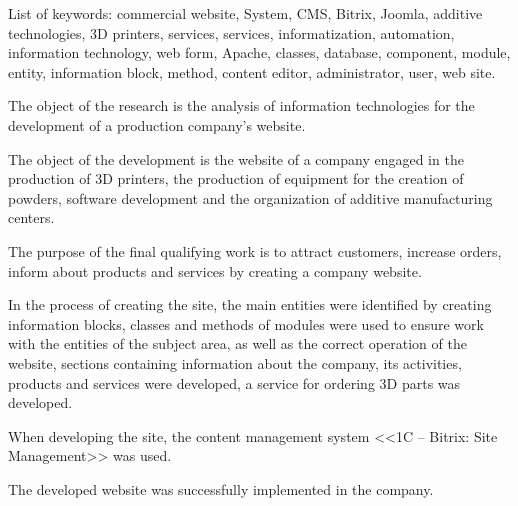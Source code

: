 List of keywords: commercial website, System, CMS, Bitrix, Joomla, additive technologies, 3D printers, services, services, informatization, automation, information technology, web form, Apache, classes, database, component, module, entity, information block, method, content editor, administrator, user, web site.

The object of the research is the analysis of information technologies for the development of a production company's website.

The object of the development is the website of a company engaged in the production of 3D printers, the production of equipment for the creation of powders, software development and the organization of additive manufacturing centers.

The purpose of the final qualifying work is to attract customers, increase orders, inform about products and services by creating a company website.

In the process of creating the site, the main entities were identified by creating information blocks, classes and methods of modules were used to ensure work with the entities of the subject area, as well as the correct operation of the website, sections containing information about the company, its activities, products and services were developed, a service for ordering 3D parts was developed.

When developing the site, the content management system <<1C – Bitrix: Site Management>> was used.

The developed website was successfully implemented in the company.
